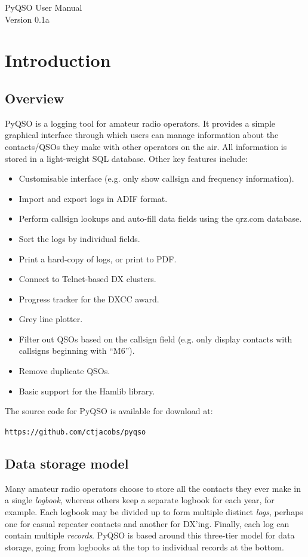 \documentclass[11pt, a4paper]{report}
\begin{document}
\begin{titlepage}
\begin{center}
\vspace*{5cm}
\huge{PyQSO User Manual}\\\vspace*{5cm}
\LARGE{Version 0.1a}
\end{center}
\end{titlepage}

\tableofcontents

\chapter{Introduction}\label{chap:introduction}
\section{Overview}
PyQSO is a logging tool for amateur radio operators. It provides a simple graphical interface through which users can manage information about the contacts/QSOs they make with other operators on the air. All information is stored in a light-weight SQL database. Other key features include:
\begin{itemize}
  \item Customisable interface (e.g. only show callsign and frequency information).
  \item Import and export logs in ADIF format.
  \item Perform callsign lookups and auto-fill data fields using the qrz.com database.
  \item Sort the logs by individual fields.
  \item Print a hard-copy of logs, or print to PDF.
  \item Connect to Telnet-based DX clusters.
  \item Progress tracker for the DXCC award.
  \item Grey line plotter.
  \item Filter out QSOs based on the callsign field (e.g. only display contacts with callsigns beginning with ``M6'').
  \item Remove duplicate QSOs.
  \item Basic support for the Hamlib library.
\end{itemize}
The source code for PyQSO is available for download at:

\texttt{https://github.com/ctjacobs/pyqso}

\section{Data storage model}
Many amateur radio operators choose to store all the contacts they ever make in a single \textit{logbook}, whereas others keep a separate logbook for each year, for example. Each logbook may be divided up to form multiple distinct \textit{logs}, perhaps one for casual repeater contacts and another for DX'ing. Finally, each log can contain multiple \textit{records}. PyQSO is based around this three-tier model for data storage, going from logbooks at the top to individual records at the bottom. 
\end{document}
